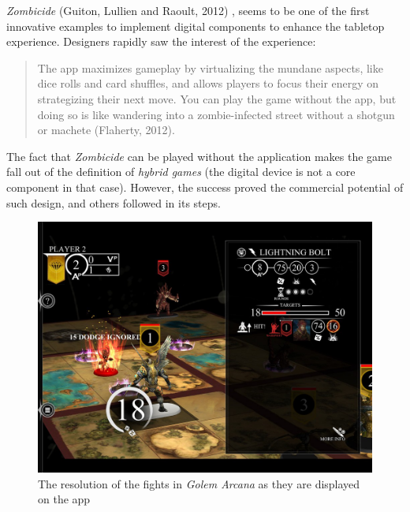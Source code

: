 \textit{Zombicide} (Guiton, Lullien and Raoult, 2012) \cite{game:zombi}, seems to be one of the first innovative examples to implement digital components to enhance the tabletop experience. Designers rapidly saw the interest of the experience:
\begin{quotation}
The app maximizes gameplay by virtualizing the mundane aspects, like dice rolls and card shuffles, and allows players to focus their energy on strategizing their next move. You can play the game without the app, but doing so is like wandering into a zombie-infected street without a shotgun or machete (Flaherty, 2012)\cite{web:wired}.
\end{quotation}
The fact that \textit{Zombicide} can be played without the application makes the game fall out of the definition of \textit{hybrid games} (the digital device is not a core component in that case). However, the success proved the commercial potential of such design, and others followed in its steps.

\begin{figure}[h]
    \centering
    \includegraphics[scale=0.2]{Images/golem_app.jpg}
    \caption{The resolution of the fights in \textit{Golem Arcana} as they are displayed on the app}
    \label{fig:Golem}
\end{figure}

